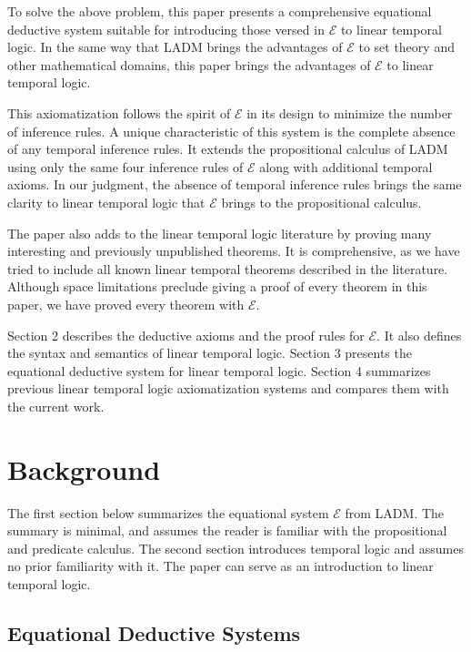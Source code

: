 \documentclass[12pt, fleqn, leqno]{article}
\begin{document}
To solve the above problem, this paper presents a comprehensive equational deductive system suitable for introducing those versed in $\mathcal{E}$ to linear temporal logic.
In the same way that LADM brings the advantages of $\mathcal{E}$ to set theory and other mathematical domains, this paper brings the advantages of $\mathcal{E}$ to linear temporal logic.

This axiomatization follows the spirit of $\mathcal{E}$ in its design to minimize the number of inference rules.
A unique characteristic of this system is the complete absence of any temporal inference rules.
It extends the propositional calculus of LADM using only the same four inference rules of $\mathcal{E}$ along with additional temporal axioms.
In our judgment, the absence of temporal inference rules brings the same clarity to linear temporal logic that $\mathcal{E}$ brings to the propositional calculus.

The paper also adds to the linear temporal logic literature by proving many interesting and previously unpublished theorems.
It is comprehensive, as we have tried to include all known linear temporal theorems described in the literature.
Although space limitations preclude giving a proof of every theorem in this paper, we have proved every theorem with $\mathcal{E}$.

Section 2 describes the deductive axioms and the proof rules for $\mathcal{E}$.
It also defines the syntax and semantics of linear temporal logic.
Section 3 presents the equational deductive system for linear temporal logic.
Section 4 summarizes previous linear temporal logic axiomatization systems and compares them with the current work.

\section{Background}

The first section below summarizes the equational system $\mathcal{E}$ from LADM.
The summary is minimal, and assumes the reader is familiar with the propositional and predicate calculus.
The second section introduces temporal logic and assumes no prior familiarity with it.
The paper can serve as an introduction to linear temporal logic.

\subsection{Equational Deductive Systems}\label{sec-equational-deductive-systems}
\end{document}
